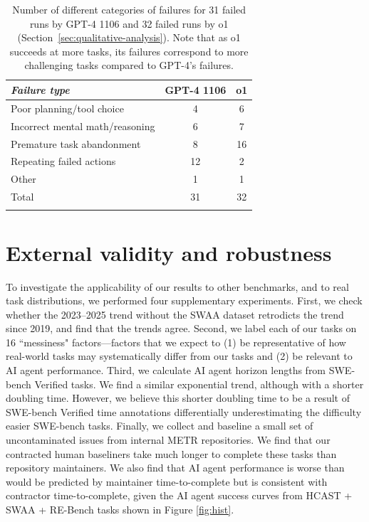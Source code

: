 \documentclass{article}
\newcommand{\gabenchmark}{HCAST}
\begin{document}
\begin{table}[t]
    \centering
    \begin{tabular}{lcc}
        \hline
        \textit{Failure type} & GPT-4 1106 & o1 \\
        \hline
        Poor planning/tool choice & 4 & 6 \\
        Incorrect mental math/reasoning & 6 & 7 \\
        Premature task abandonment& 8 & 16\\
        Repeating failed actions & 12 & 2\\
        Other & 1 & 1\\
        \hline
        Total & 31 & 32\\
        \hline \\
    \end{tabular}
    \caption{Number of different categories of failures for 31 failed runs by GPT-4 1106 and 32 failed runs by o1 (Section~\ref{sec:qualitative-analysis}). Note that as o1 succeeds at more tasks, its failures correspond to more challenging tasks compared to GPT-4's failures.}
    \label{tab:failure-comparison}
\end{table}

\section{External validity and robustness} \label{sec:externalvalidity}

To investigate the applicability of our results to other benchmarks, and to real task distributions, we performed four supplementary experiments. 
First, we check whether the 2023--2025 trend without the SWAA dataset retrodicts the trend since 2019, and find that the trends agree.
Second, we label each of our tasks on 16 ``messiness" factors---factors that we expect to (1) be representative of how real-world tasks may systematically differ from our tasks and (2) be relevant to AI agent performance.
Third, we calculate AI agent horizon lengths from SWE-bench Verified tasks. We find a similar exponential trend, although with a shorter doubling time. However, we believe this shorter doubling time to be a result of SWE-bench Verified time annotations differentially underestimating the difficulty easier SWE-bench tasks.
Finally, we collect and baseline a small set of uncontaminated issues from internal METR repositories. We find that our contracted human baseliners take much longer to complete these tasks than repository maintainers. We also find that AI agent performance is worse than would be predicted by maintainer time-to-complete but is consistent with contractor time-to-complete, given the AI agent success curves from \gabenchmark{} + SWAA + RE-Bench tasks shown in Figure \ref{fig:hist}. 
\end{document}
